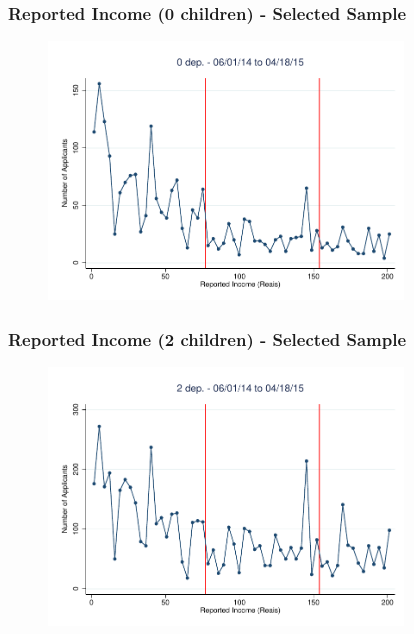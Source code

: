 \documentclass[xcolor=pdftex,dvipsnames,table]{beamer}
\begin{document}
\begin{frame}[label=ybar0_sel]
\frametitle{Reported Income  (0 children) - Selected Sample}
\begin{figure}[H]
\begin{center}
\includegraphics[height=2.7in]{Dom1_060114_non_0_bin3p5.pdf}
\end{center}
\end{figure}
\hyperlink{ybar0}{}
\end{frame}

\begin{frame}[label=ybar2_sel]
\frametitle{Reported Income (2 children) - Selected Sample}
\begin{figure}[H]
\begin{center}
\includegraphics[height=2.7in]{Dom1_060114_non_2_bin3p5.pdf}
\end{center}
\end{figure}
\hyperlink{ybar2_sel}{}
\end{frame}
\end{document}
